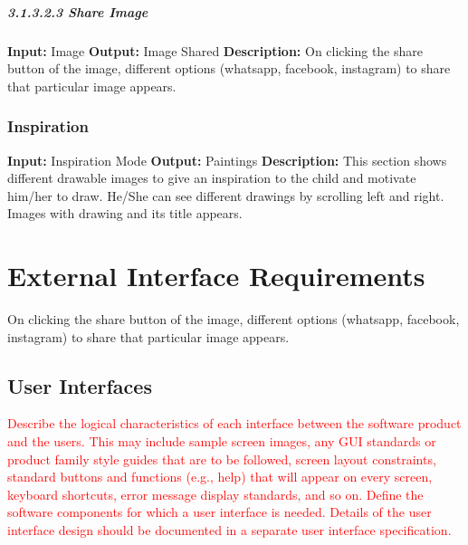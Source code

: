 \documentclass{scrreprt}
\begin{document}
\paragraph{3.1.3.2.3 Share Image}
\hfill \vspace{2.5mm} \break 
\textbf{Input:} Image \newline
\textbf{Output:} Image Shared
\vspace{1mm}\newline
\textbf{Description:} \newline 
On clicking the share button of the image, different options (whatsapp, facebook, instagram) to share that particular image appears.


\subsection{Inspiration}
\textbf{Input:} Inspiration Mode \newline
\textbf{Output:} Paintings
\vspace{1mm}\newline
\textbf{Description:} \newline 
This section shows different drawable images to give an inspiration to the child and motivate him/her to draw. He/She can see different drawings by scrolling left and right. Images with drawing and its title appears.

\chapter{External Interface Requirements}
On clicking the share button of the image, different options (whatsapp, facebook, instagram) to share that particular image appears.

\section{User Interfaces}
\textcolor{red}{Describe the logical characteristics of each interface between the software product and the users. This may include sample screen images, any GUI standards or product family style guides that are to be followed, screen layout constraints, standard buttons and functions (e.g., help) that will appear on every screen, keyboard shortcuts, error message display standards, and so on.  
Define the software components for which a user interface is needed. Details of the user interface design should be documented in a separate user interface specification.}
\end{document}

